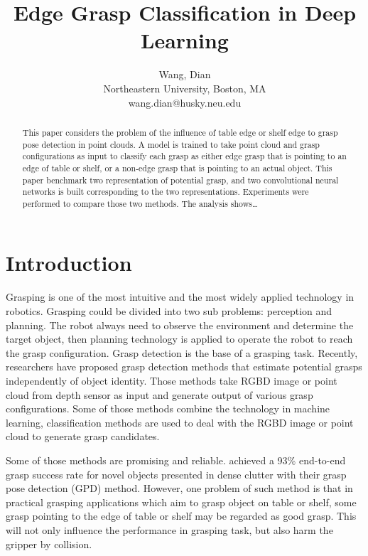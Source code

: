 \documentclass[letterpaper]{article} %
\begin{document}
%

\title{Edge Grasp Classification in Deep Learning}
\author{Wang, Dian\\
Northeastern University, Boston, MA\\
{wang.dian@husky.neu.edu}
}
\maketitle
\begin{abstract}
This paper considers the problem of the influence of table edge or shelf edge to grasp pose detection in point clouds. A model is trained to take point cloud and grasp configurations as input to classify each grasp as either edge grasp that is pointing to an edge of table or shelf, or a non-edge grasp that is pointing to an actual object. This paper benchmark two representation of potential grasp, and two convolutional neural networks is built corresponding to the two representations. Experiments were performed to compare those two methods. The analysis shows…
\end{abstract}

\section{Introduction}
\noindent Grasping is one of the most intuitive and the most widely applied technology in robotics. Grasping could be divided into two sub problems: perception and planning. The robot always need to observe the environment and determine the target object, then planning technology is applied to operate the robot to reach the grasp configuration. Grasp detection is the base of a grasping task.  Recently, researchers have proposed grasp detection methods that estimate potential grasps independently of object identity. Those methods take RGBD image or point cloud from depth sensor as input and generate output of various grasp configurations. Some of those methods combine the technology in machine learning, classification methods are used to deal with the RGBD image or point cloud to generate grasp candidates.

Some of those methods are promising and reliable. \cite{RN6} achieved a 93\% end-to-end grasp success rate for novel objects presented in dense clutter with their grasp pose detection (GPD) method. However, one problem of such method is that in practical grasping applications which aim to grasp object on table or shelf, some grasp pointing to the edge of table or shelf may be regarded as good grasp. This will not only influence the performance in grasping task, but also harm the gripper by collision. 
\end{document}
